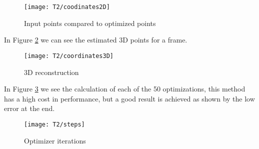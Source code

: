 \begin{figure}[h]
    \centering
    \texttt{[image: T2/coodinates2D]}
    \caption{Input points compared to optimized points}
    \label{fig:coodinates2D}
\end{figure}

\noindent In Figure \ref{fig:coordinates3D} we can see the estimated 3D points for a frame.\\
\begin{figure}[h]
    \centering
    \texttt{[image: T2/coordinates3D]}
    \caption{3D reconstruction}
    \label{fig:coordinates3D}
\end{figure}
\noindent In Figure \ref{fig:steps} we see the calculation of each of the 50 optimizations, this method has a high cost in performance, but a good result is achieved as shown by the low error at the end.\\
\begin{figure}[h]
    \centering
    \texttt{[image: T2/steps]}
    \caption{Optimizer iterations}
    \label{fig:steps}
\end{figure}
